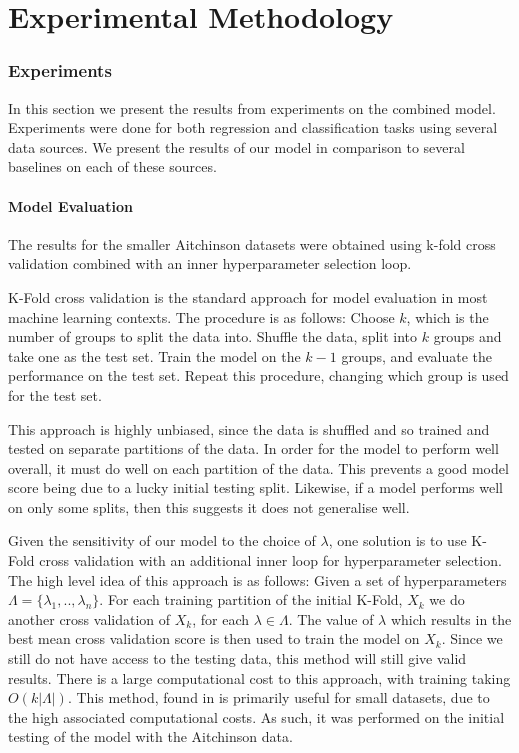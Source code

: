 \chapter{Experimental Methodology}
\label{cha:methodology}

\subsection{Experiments}
In this section we present the results from experiments on the combined model. Experiments were done for both regression and classification tasks using several data sources. We present the results of our model in comparison to several baselines on each of these sources. 

\subsubsection{Model Evaluation}
The results for the smaller Aitchinson datasets were obtained using  k-fold cross validation combined with an inner hyperparameter selection loop. 

K-Fold cross validation is the standard approach for model evaluation in most machine learning contexts. The procedure is as follows: Choose $k$, which is the number of groups to split the data into. Shuffle the data, split into $k$ groups and take one as the test set. Train the model on the $k-1$ groups, and evaluate the performance on the test set. Repeat this procedure, changing which group is used for the test set. 

This approach is highly unbiased, since the data is shuffled and so trained and tested on separate partitions of the data. In order for the model to perform well overall, it must do well on each partition of the data. This prevents a good model score being due to a lucky initial testing split. Likewise, if a model performs well on only some splits, then this suggests it does not generalise well.  

Given the sensitivity of our model to the choice of $\lambda$, one solution is to use K-Fold cross validation with an additional inner loop for hyperparameter selection. The high level idea of this approach is as follows: Given a set of hyperparameters $\Lambda = \{\lambda_1 ,.., \lambda_n\}$. For each training partition of the initial K-Fold, $X_k$ we do another cross validation of $X_k$, for each $\lambda \in \Lambda$. The value of $\lambda$ which results in the best mean cross validation score is then used to train the model on $X_k$. Since we still do not have access to the testing data, this method will still give valid results. There is a large computational cost to this approach, with training taking $O(k|\Lambda|)$. This method, found in \cite{walder} is primarily useful for small datasets, due to the high associated computational costs. As such, it was performed on the initial testing of the model with the Aitchinson data.     

